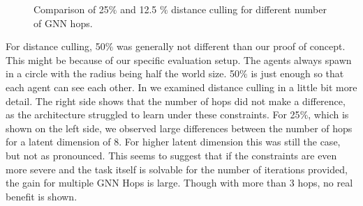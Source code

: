 \begin{figure}[htp]
    \centering
    \hspace{1cm}                       
    \caption{Comparison of 25$\%$ and 12.5 $\%$ distance culling for different number of GNN hops.}
    \label{fig:observation-distancecompare}
\end{figure}

For distance culling, 50$\%$ was generally not different than our proof of concept. This might be because of our specific evaluation setup. The agents always spawn in a circle with the radius being half the world size. 50$\%$ is just enough so that each agent can see each other.
In  we examined distance culling in a little bit more detail. The right side shows that the number of hops did not make a difference, as the architecture struggled to learn under these constraints. For 25$\%$, which is shown on the left side, we observed large differences between the number of hops for a latent dimension of 8. For higher latent dimension this was still the case, but not as pronounced. This seems to suggest that if the constraints are even more severe and the task itself is solvable for the number of iterations provided, the gain for multiple GNN Hops is large. Though with more than 3 hops, no real benefit is shown.


